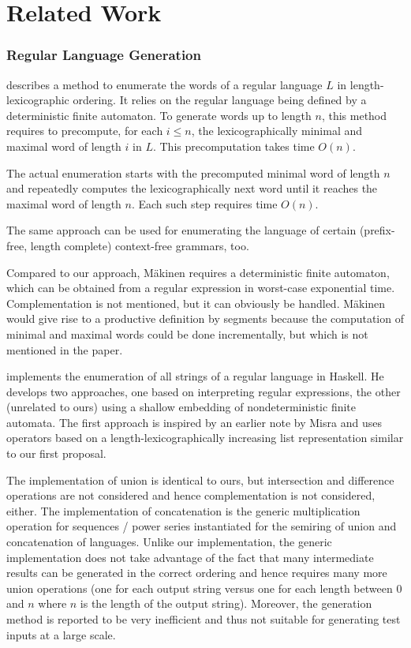 \section{Related Work}
\label{sec:related-work}

\subsubsection*{Regular Language Generation}

\citet{DBLP:journals/actaC/Makinen97} describes a method to enumerate
the words of a regular language $L$ in length-lexicographic
ordering. It relies on the regular language being defined by a
deterministic finite automaton. To generate words up to length $n$,
this method requires to precompute, for each $i\le n$, the
lexicographically minimal and maximal word of length $i$ in $L$. This
precomputation takes time $O(n)$.

The actual enumeration starts with the precomputed minimal word of
length $n$ and repeatedly computes the lexicographically next word
until it reaches the maximal word of length $n$. Each such step requires time $O(n)$. 

The same approach can be used for enumerating the language of certain
(prefix-free, length complete) context-free grammars, too.

Compared to our approach, M{\"{a}}kinen requires a deterministic
finite automaton, which can be obtained from a regular expression in
worst-case exponential time. Complementation is not mentioned, but it
can obviously be handled. M{\"{a}}kinen would give rise to a
productive definition by segments because the computation of minimal
and maximal words could be done incrementally, but which is not mentioned
in the paper.

\citet{DBLP:journals/jfp/McIlroy04} implements the enumeration of all
strings of a regular language in Haskell. He develops two approaches,
one based on interpreting regular expressions, the other (unrelated to
ours) using a shallow embedding of nondeterministic finite
automata. The first approach is inspired by an earlier note by Misra
\cite{misra11:_enumer_strin_regul_expres} and uses operators based on
a length-lexicographically increasing list representation similar to
our first proposal.

The implementation of union is identical to ours, but intersection and
difference operations are not considered and hence complementation is
not considered, either. The implementation of concatenation is the
generic multiplication operation for sequences / power series
\cite{DBLP:journals/jfp/McIlroy99} instantiated for the semiring
of union and concatenation of languages. Unlike our implementation, the generic 
implementation does not take advantage of the fact that many
intermediate results can be generated in the correct ordering and hence
requires many more union operations (one for each output string versus
one for each length between $0$ and $n$ where $n$ is the length of
the output string).  Moreover, the generation method is reported to
be very inefficient and thus not suitable for generating test inputs
at a large scale.

